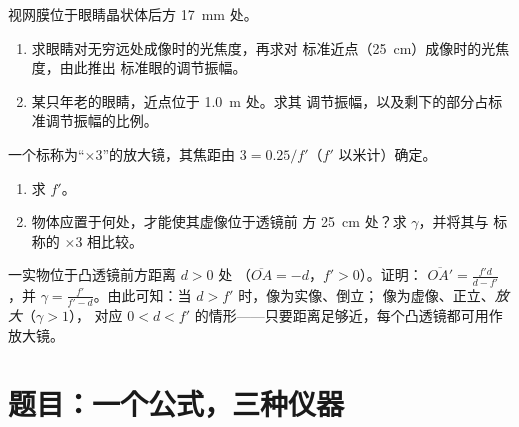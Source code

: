 \begin{exercise}[$\star\star\star$]\label{exo:g11:lenses-and-eye:13}
视网膜位于眼睛晶状体后方 \qty{17}{mm} 处。
\begin{enumerate}
  \item 求眼睛对无穷远处成像时的光焦度，再求对
        标准近点（\qty{25}{cm}）成像时的光焦度，由此推出
        标准眼的调节振幅。
  \item 某只年老的眼睛，近点位于 \qty{1.0}{m} 处。求其
        调节振幅，以及剩下的部分占标准调节振幅的比例。
\end{enumerate}
\end{exercise}

\begin{exercise}[$\star\star\star$]\label{exo:g11:lenses-and-eye:14}
一个标称为“$\times 3$”的放大镜，其焦距由
$3 = 0.25/f'$（$f'$ 以米计）确定。
\begin{enumerate}
  \item 求 $f'$。
  \item 物体应置于何处，才能使其虚像位于透镜前
        方 \qty{25}{cm} 处？求 $\gamma$，并将其与
        标称的 $\times 3$ 相比较。
\end{enumerate}
\end{exercise}

\begin{exercise}[$\star\star\star$]\label{exo:g11:lenses-and-eye:15}
一实物位于凸透镜前方距离 $d > 0$ 处
（$\overline{OA} = -d$，$f' > 0$）。证明：
$\overline{OA'} = \frac{f'd}{d - f'}$，并
$\gamma = \frac{f'}{f' - d}$。由此可知：当 $d > f'$ 时，像为实像、倒立；
像为虚像、正立、\emph{放大}（$\gamma > 1$），
对应 $0 < d < f'$ 的情形——只要距离足够近，每个凸透镜都可用作放大镜。
\end{exercise}

\section{题目：一个公式，三种仪器}

